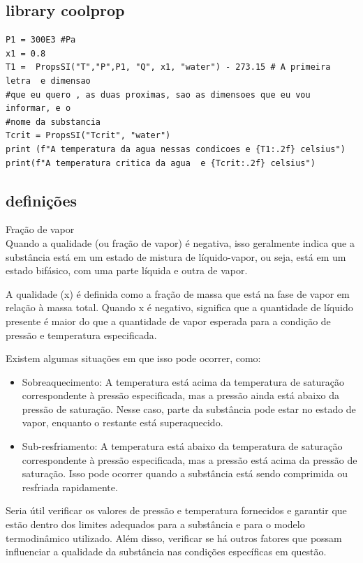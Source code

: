 \documentclass{article}
\begin{document}
\subsection{library coolprop}
\begin{lstlisting}
P1 = 300E3 #Pa
x1 = 0.8
T1 =  PropsSI("T","P",P1, "Q", x1, "water") - 273.15 # A primeira letra  e dimensao 
#que eu quero , as duas proximas, sao as dimensoes que eu vou informar, e o 
#nome da substancia
Tcrit = PropsSI("Tcrit", "water") 
print (f"A temperatura da agua nessas condicoes e {T1:.2f} celsius")
print(f"A temperatura critica da agua  e {Tcrit:.2f} celsius")
\end{lstlisting}

\subsection{definições}{Fração de vapor}\\
Quando a qualidade (ou fração de vapor) é negativa, isso geralmente indica que a substância está em um estado de mistura de líquido-vapor, ou seja, está em um estado bifásico, com uma parte líquida e outra de vapor.

A qualidade (x) é definida como a fração de massa que está na fase de vapor em relação à massa total. Quando x é negativo, significa que a quantidade de líquido presente é maior do que a quantidade de vapor esperada para a condição de pressão e temperatura especificada.

Existem algumas situações em que isso pode ocorrer, como:
\begin{itemize}
    \item Sobreaquecimento: A temperatura está acima da temperatura de saturação correspondente à pressão especificada, mas a pressão ainda está abaixo da pressão de saturação. Nesse caso, parte da substância pode estar no estado de vapor, enquanto o restante está superaquecido.

    \item Sub-resfriamento: A temperatura está abaixo da temperatura de saturação correspondente à pressão especificada, mas a pressão está acima da pressão de saturação. Isso pode ocorrer quando a substância está sendo comprimida ou resfriada rapidamente.

\end{itemize}


Seria útil verificar os valores de pressão e temperatura fornecidos e garantir que estão dentro dos limites adequados para a substância e para o modelo termodinâmico utilizado. Além disso, verificar se há outros fatores que possam influenciar a qualidade da substância nas condições específicas em questão.
\end{document}
